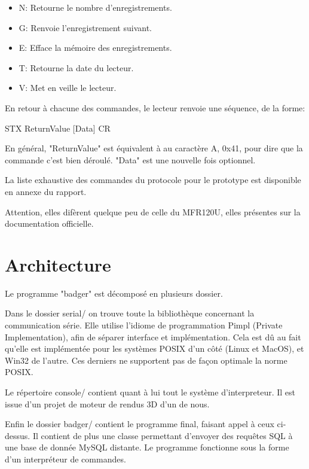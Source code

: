     \begin{itemize}
        \item N: Retourne le nombre d'enregistrements.
        \item G: Renvoie l'enregistrement suivant.
        \item E: Efface la mémoire des enregistrements.
        \item T: Retourne la date du lecteur.
        \item V: Met en veille le lecteur.
    \end{itemize}

En retour à chacune des commandes, le lecteur renvoie une séquence, de la forme:

STX ReturnValue [Data] CR

    En général, "ReturnValue" est équivalent à au caractère A, 0x41, pour dire que
la commande c'est bien déroulé. "Data" est une nouvelle fois optionnel.

    La liste exhaustive des commandes du protocole pour le prototype est disponible
en annexe du rapport. 

    Attention, elles difèrent quelque peu de celle du MFR120U, elles présentes sur 
la documentation officielle.




\section{Architecture}
    Le programme "badger" est décomposé en plusieurs dossier. 

    Dans le dossier serial/ on trouve toute la bibliothèque concernant la communication
série. Elle utilise l'idiome de programmation Pimpl (Private Implementation), afin 
de séparer interface et implémentation. Cela est dû au fait qu'elle est implémentée
pour les systèmes POSIX d'un côté (Linux et MacOS), et Win32 de l'autre. Ces derniers
ne supportent pas de façon optimale la norme POSIX.

    Le répertoire console/ contient quant à lui tout le système d'interpreteur.
Il est issue d'un projet de moteur de rendus 3D d'un de nous.

    Enfin le dossier badger/ contient le programme final, faisant appel à ceux
ci-dessus. Il contient de plus une classe permettant d'envoyer des requêtes SQL
à une base de donnée MySQL distante. Le programme fonctionne sous la forme d'un 
interpréteur de commandes.





